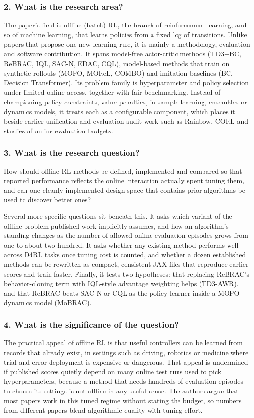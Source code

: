 \documentclass[11pt]{article}
\newcommand{\question}[1]{\subsubsection*{#1}}
\begin{document}
\question{2. What is the research area?}

The paper's field is offline (batch) RL, the branch of reinforcement learning, and so of machine learning, that learns policies from a fixed log of transitions. Unlike papers that propose one new learning rule, it is mainly a methodology, evaluation and software contribution. It spans model-free actor-critic methods (TD3+BC, ReBRAC, IQL, SAC-N, EDAC, CQL), model-based methods that train on synthetic rollouts (MOPO, MOReL, COMBO) and imitation baselines (BC, Decision Transformer). Its problem family is hyperparameter and policy selection under limited online access, together with fair benchmarking. Instead of championing policy constraints, value penalties, in-sample learning, ensembles or dynamics models, it treats each as a configurable component, which places it beside earlier unification and evaluation-audit work such as Rainbow, CORL and studies of online evaluation budgets.

\question{3. What is the research question?}

How should offline RL methods be defined, implemented and compared so that reported performance reflects the online interaction actually spent tuning them, and can one cleanly implemented design space that contains prior algorithms be used to discover better ones?

Several more specific questions sit beneath this. It asks which variant of the offline problem published work implicitly assumes, and how an algorithm's standing changes as the number of allowed online evaluation episodes grows from one to about two hundred. It asks whether any existing method performs well across D4RL tasks once tuning cost is counted, and whether a dozen established methods can be rewritten as compact, consistent JAX files that reproduce earlier scores and train faster. Finally, it tests two hypotheses: that replacing ReBRAC's behavior-cloning term with IQL-style advantage weighting helps (TD3-AWR), and that ReBRAC beats SAC-N or CQL as the policy learner inside a MOPO dynamics model (MoBRAC).

\question{4. What is the significance of the question?}

The practical appeal of offline RL is that useful controllers can be learned from records that already exist, in settings such as driving, robotics or medicine where trial-and-error deployment is expensive or dangerous. That appeal is undermined if published scores quietly depend on many online test runs used to pick hyperparameters, because a method that needs hundreds of evaluation episodes to choose its settings is not offline in any useful sense. The authors argue that most papers work in this tuned regime without stating the budget, so numbers from different papers blend algorithmic quality with tuning effort.
\end{document}

